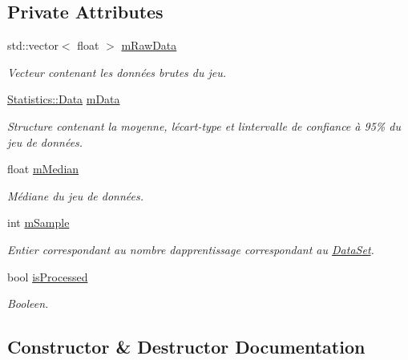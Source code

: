 \subsection*{Private Attributes}
\begin{DoxyCompactItemize}
\item 
std\+::vector$<$ float $>$ \hyperlink{classDataSet_a578c8ddd82c2e24468d88bfd4cbfc917}{m\+Raw\+Data}
\begin{DoxyCompactList}\small\item\em Vecteur contenant les données brutes du jeu. \end{DoxyCompactList}\item 
\hyperlink{structStatistics_1_1Data}{Statistics\+::\+Data} \hyperlink{classDataSet_a043f1a249aa8752a8cc3115fbee61e2e}{m\+Data}
\begin{DoxyCompactList}\small\item\em Structure contenant la moyenne, l\textquotesingle{}écart-\/type et l\textquotesingle{}intervalle de confiance à 95\% du jeu de données. \end{DoxyCompactList}\item 
float \hyperlink{classDataSet_acf52ca5fc1f11ea8f027c7b7ad1e0d34}{m\+Median}
\begin{DoxyCompactList}\small\item\em Médiane du jeu de données. \end{DoxyCompactList}\item 
int \hyperlink{classDataSet_a0a2e6525fdc36753382e0546e26198df}{m\+Sample}
\begin{DoxyCompactList}\small\item\em Entier correspondant au nombre d\textquotesingle{}apprentissage correspondant au \hyperlink{classDataSet}{Data\+Set}. \end{DoxyCompactList}\item 
bool \hyperlink{classDataSet_acc6a6082256c926e1ad8bfa713966441}{is\+Processed}
\begin{DoxyCompactList}\small\item\em Booleen. \end{DoxyCompactList}\end{DoxyCompactItemize}


\subsection{Constructor \& Destructor Documentation}
\mbox{\label{classDataSet_ab45c95dc19f12a9217c0f3da7ac92b6a}} 

